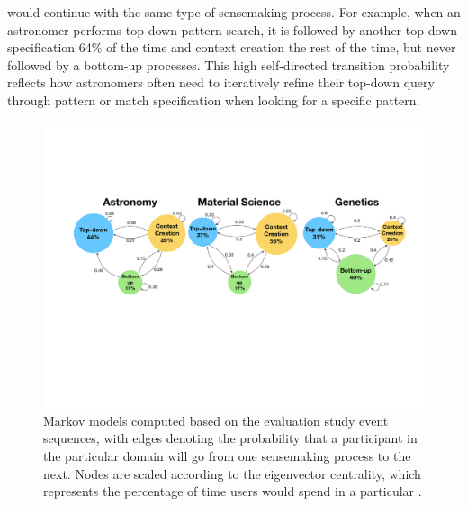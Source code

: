 would continue with the same type of sensemaking process.
For example, when an astronomer performs top-down pattern search,
it is followed by another top-down specification
64\% of the time and context creation the rest of the time,
but never followed by a bottom-up processes.
This high self-directed transition probability
reflects how astronomers often need to iteratively
refine their top-down query through pattern
or match specification when looking for a specific pattern. %
\begin{figure}[h!]
  \includegraphics[width=\linewidth]{figures/markov_transition.pdf}
  \caption{Markov models computed based on the evaluation study event sequences, with edges denoting the probability that a participant in the particular domain will go from one sensemaking process to the next. Nodes are scaled according to the eigenvector centrality, which represents the percentage of time users would spend in a particular .}\label{fig:transition}
\end{figure}
